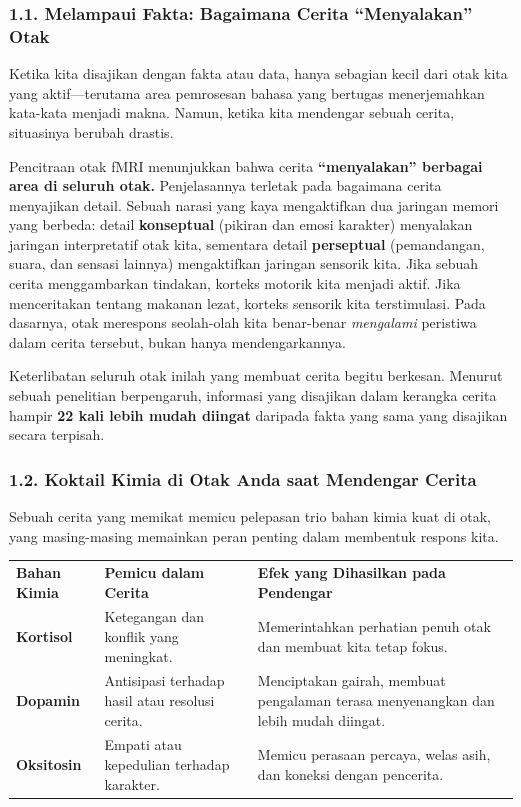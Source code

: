 \documentclass[
  letterpaper,
  DIV=11,
  numbers=noendperiod]{scrreprt}
\begin{document}
\subsubsection{1.1. Melampaui Fakta: Bagaimana Cerita ``Menyalakan''
Otak}\label{melampaui-fakta-bagaimana-cerita-menyalakan-otak}

Ketika kita disajikan dengan fakta atau data, hanya sebagian kecil dari
otak kita yang aktif---terutama area pemrosesan bahasa yang bertugas
menerjemahkan kata-kata menjadi makna. Namun, ketika kita mendengar
sebuah cerita, situasinya berubah drastis.

Pencitraan otak fMRI menunjukkan bahwa cerita \textbf{``menyalakan''
berbagai area di seluruh otak.} Penjelasannya terletak pada bagaimana
cerita menyajikan detail. Sebuah narasi yang kaya mengaktifkan dua
jaringan memori yang berbeda: detail \textbf{konseptual} (pikiran dan
emosi karakter) menyalakan jaringan interpretatif otak kita, sementara
detail \textbf{perseptual} (pemandangan, suara, dan sensasi lainnya)
mengaktifkan jaringan sensorik kita. Jika sebuah cerita menggambarkan
tindakan, korteks motorik kita menjadi aktif. Jika menceritakan tentang
makanan lezat, korteks sensorik kita terstimulasi. Pada dasarnya, otak
merespons seolah-olah kita benar-benar \emph{mengalami} peristiwa dalam
cerita tersebut, bukan hanya mendengarkannya.

Keterlibatan seluruh otak inilah yang membuat cerita begitu berkesan.
Menurut sebuah penelitian berpengaruh, informasi yang disajikan dalam
kerangka cerita hampir \textbf{22 kali lebih mudah diingat} daripada
fakta yang sama yang disajikan secara terpisah.

\subsubsection{1.2. Koktail Kimia di Otak Anda saat Mendengar
Cerita}\label{koktail-kimia-di-otak-anda-saat-mendengar-cerita}

Sebuah cerita yang memikat memicu pelepasan trio bahan kimia kuat di
otak, yang masing-masing memainkan peran penting dalam membentuk respons
kita.

\begin{longtable}[]{@{}
  >{\raggedright\arraybackslash}p{}
  >{\raggedright\arraybackslash}p{}
  >{\raggedright\arraybackslash}p{}@{}}
\toprule\noalign{}
\endhead
\bottomrule\noalign{}
\endlastfoot
\textbf{Bahan Kimia} & \textbf{Pemicu dalam Cerita} & \textbf{Efek yang
Dihasilkan pada Pendengar} \\
\textbf{Kortisol} & Ketegangan dan konflik yang meningkat. &
Memerintahkan perhatian penuh otak dan membuat kita tetap fokus. \\
\textbf{Dopamin} & Antisipasi terhadap hasil atau resolusi cerita. &
Menciptakan gairah, membuat pengalaman terasa menyenangkan dan lebih
mudah diingat. \\
\textbf{Oksitosin} & Empati atau kepedulian terhadap karakter. & Memicu
perasaan percaya, welas asih, dan koneksi dengan pencerita. \\
\end{longtable}
\end{document}
